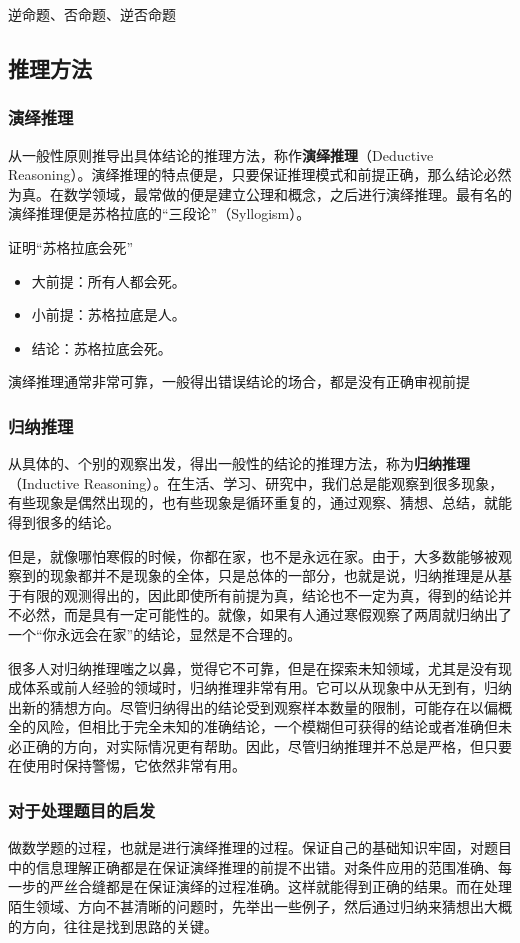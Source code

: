 逆命题、否命题、逆否命题

\subsection{推理方法}

\subsubsection{演绎推理}

从一般性原则推导出具体结论的推理方法，称作\textbf{演绎推理}（Deductive Reasoning）。演绎推理的特点便是，只要保证推理模式和前提正确，那么结论必然为真。在数学领域，最常做的便是建立公理和概念，之后进行演绎推理。最有名的演绎推理便是苏格拉底的“三段论”（Syllogism）。

\begin{example}{证明“苏格拉底会死”}
\begin{itemize}
\item 大前提：所有人都会死。
\item 小前提：苏格拉底是人。
\item 结论：苏格拉底会死。
\end{itemize}
\end{example}

演绎推理通常非常可靠，一般得出错误结论的场合，都是没有正确审视前提

\subsubsection{归纳推理}

从具体的、个别的观察出发，得出一般性的结论的推理方法，称为\textbf{归纳推理}（Inductive Reasoning）。在生活、学习、研究中，我们总是能观察到很多现象，有些现象是偶然出现的，也有些现象是循环重复的，通过观察、猜想、总结，就能得到很多的结论。

但是，就像哪怕寒假的时候，你都在家，也不是永远在家。由于，大多数能够被观察到的现象都并不是现象的全体，只是总体的一部分，也就是说，归纳推理是从基于有限的观测得出的，因此即使所有前提为真，结论也不一定为真，得到的结论并不必然，而是具有一定可能性的。就像，如果有人通过寒假观察了两周就归纳出了一个“你永远会在家”的结论，显然是不合理的。

很多人对归纳推理嗤之以鼻，觉得它不可靠，但是在探索未知领域，尤其是没有现成体系或前人经验的领域时，归纳推理非常有用。它可以从现象中从无到有，归纳出新的猜想方向。尽管归纳得出的结论受到观察样本数量的限制，可能存在以偏概全的风险，但相比于完全未知的准确结论，一个模糊但可获得的结论或者准确但未必正确的方向，对实际情况更有帮助。因此，尽管归纳推理并不总是严格，但只要在使用时保持警惕，它依然非常有用。

\subsubsection{对于处理题目的启发}

做数学题的过程，也就是进行演绎推理的过程。保证自己的基础知识牢固，对题目中的信息理解正确都是在保证演绎推理的前提不出错。对条件应用的范围准确、每一步的严丝合缝都是在保证演绎的过程准确。这样就能得到正确的结果。而在处理陌生领域、方向不甚清晰的问题时，先举出一些例子，然后通过归纳来猜想出大概的方向，往往是找到思路的关键。